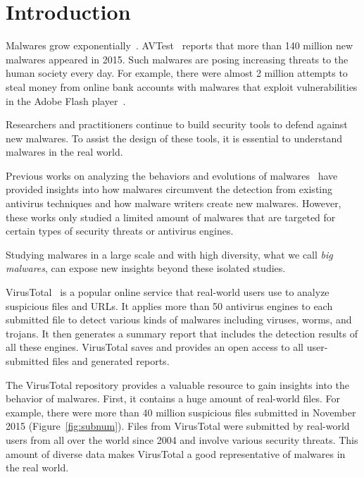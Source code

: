 \vspace{-0.1in}
\section{Introduction}

Malwares grow exponentially~\cite{avtest}. 
AVTest~\cite{avtest} reports that more than 140 million new malwares appeared in 2015. 
Such malwares are posing increasing threats to the human society every day. 
For example, there were almost 2 million attempts to 
steal money from online bank accounts 
with malwares that exploit vulnerabilities in the Adobe Flash player~\cite{kaspersky}. 

Researchers and practitioners continue to build security tools to defend against new malwares.
To assist the design of these tools, it is essential to understand malwares in the real world. 

Previous works on analyzing the behaviors and evolutions of malwares~\cite{ZhouSP2012,GuptaComsnets2009} 
have provided insights 
into how malwares circumvent the detection from existing antivirus techniques and how malware writers create new malwares. 
However, these works only studied a limited amount of malwares that are targeted for certain types of security threats or antivirus engines.

Studying malwares in a large scale and with high diversity, what we call {\em big malwares}, 
can expose new insights beyond these isolated studies.

VirusTotal~\cite{virustotal} is a popular online service that real-world users use to analyze suspicious files and URLs.
It applies more than 50 antivirus engines to each submitted file 
to detect various kinds of malwares including viruses, worms, and trojans. 
It then generates a summary report that includes the detection results of all these engines. 
VirusTotal saves and provides an open access to all user-submitted files and generated reports. 

The VirusTotal repository provides a valuable resource to gain insights into 
the behavior of malwares.
%
First, it contains a huge amount of real-world files.
For example, there were more than 40 million suspicious files submitted in November 2015 (Figure~\ref{fig:subnum}). 
Files from VirusTotal were submitted by real-world users from all over the world since 2004
and involve various security threats. 
This amount of diverse data makes VirusTotal a good representative of malwares in the real world. 

